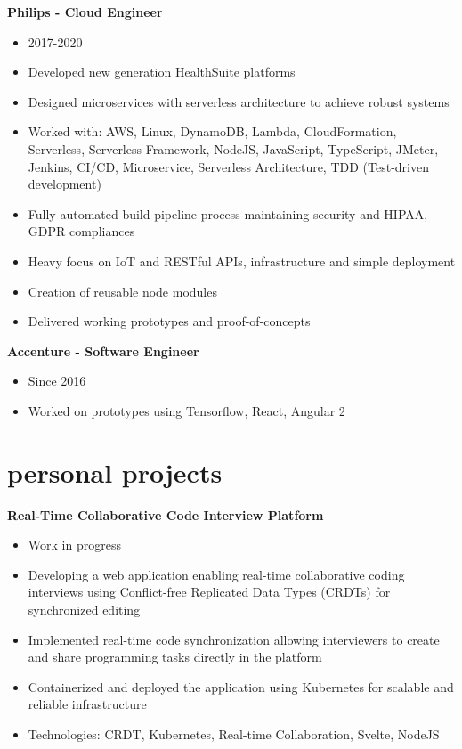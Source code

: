 \documentclass[]{friggeri-cv}
\begin{document}
\textbf{Philips - Cloud Engineer}
\begin{itemize}
  \item 2017-2020
  \item Developed new generation HealthSuite platforms
  \item Designed microservices with serverless architecture to achieve robust systems
  \item Worked with: AWS, Linux, DynamoDB, Lambda, CloudFormation, Serverless, Serverless Framework, NodeJS, JavaScript, TypeScript, JMeter, Jenkins, CI/CD, Microservice, Serverless Architecture, TDD (Test-driven development)
  \item Fully automated build pipeline process maintaining security and HIPAA, GDPR compliances
  \item Heavy focus on IoT and RESTful APIs, infrastructure and simple deployment
  \item Creation of reusable node modules
  \item Delivered working prototypes and proof-of-concepts
\end{itemize}

\textbf{Accenture - Software Engineer}
\begin{itemize}
  \item Since 2016
  \item Worked on prototypes using Tensorflow, React, Angular 2
\end{itemize}

\section{personal projects}

\textbf{Real-Time Collaborative Code Interview Platform}
\begin{itemize}
  \item Work in progress
  \item Developing a web application enabling real-time collaborative coding interviews using Conflict-free Replicated Data Types (CRDTs) for synchronized editing
  \item Implemented real-time code synchronization allowing interviewers to create and share programming tasks directly in the platform
  \item Containerized and deployed the application using Kubernetes for scalable and reliable infrastructure
  \item Technologies: CRDT, Kubernetes, Real-time Collaboration, Svelte, NodeJS
\end{itemize}
\end{document}
